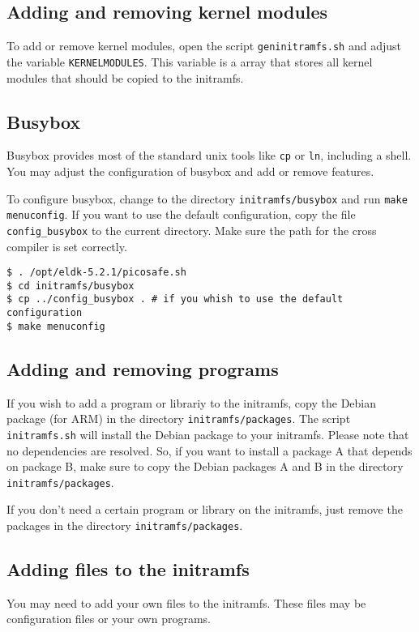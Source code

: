 \subsection{Adding and removing kernel modules}
To add or remove kernel modules, open the script \texttt{geninitramfs.sh} and
adjust the variable \texttt{KERNELMODULES}. This variable is a array that
stores all kernel modules that should be copied to the initramfs.

\subsection{Busybox}
Busybox provides most of the standard unix tools like \texttt{cp} or
\texttt{ln}, including a shell. You may adjust the configuration of busybox and
add or remove features.

To configure busybox, change to the directory \texttt{initramfs/busybox} and
run \texttt{make menuconfig}. If you want to use the default configuration,
copy the file \texttt{config\_busybox} to the current directory. Make sure the
path for the cross compiler is set correctly.

\texttt{\$ . /opt/eldk-5.2.1/picosafe.sh} \\
\texttt{\$ cd initramfs/busybox} \\
\texttt{\$ cp ../config\_busybox . \# if you whish to use the default configuration} \\
\texttt{\$ make menuconfig}

\subsection{Adding and removing programs}
If you wish to add a program or librariy to the initramfs, copy the Debian
package (for ARM) in the directory \texttt{initramfs/packages}. The script \texttt{initramfs.sh}
will install the Debian package to your initramfs. Please note that no
dependencies are resolved. So, if you want to install a package A that depends
on package B, make sure to copy the Debian packages A and B in the
directory \texttt{initramfs/packages}.

If you don't need a certain program or library on the initramfs, just remove
the packages in the directory \texttt{initramfs/packages}.

\subsection{Adding files to the initramfs}
You may need to add your own files to the initramfs. These files may be
configuration files or your own programs.

